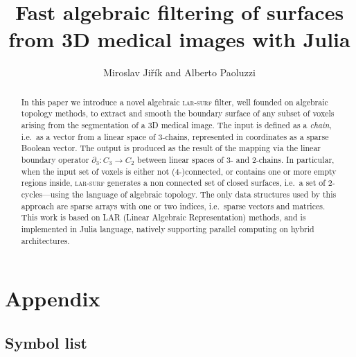 \documentclass[11pt, oneside]{article}   	%
\title{Fast algebraic filtering of surfaces from 3D medical images with Julia}
\author{Miroslav Ji\v{r}\'ik and Alberto Paoluzzi}
\date{}							%
\begin{document}
\maketitle

\begin{abstract}
In this paper we introduce a novel algebraic \textsc{lar-surf} filter, well founded on algebraic topology methods, to extract and smooth the boundary surface of any subset of voxels arising from the segmentation of a 3D medical image. The input is defined as a \emph{chain}, i.e.~as a vector from a linear space of 3-chains, represented in coordinates as a sparse Boolean vector. The output is produced as the result of the mapping via the linear boundary operator $\partial_3:C_3 \to C_2$ between linear spaces of 3- and 2-chains.  In particular, when the input set of voxels is either not (4-)connected, or contains one or more empty regions inside, \textsc{lar-surf} generates a non connected set of closed surfaces, i.e.~a set of 2-cycles---using the language of algebraic topology. The only data structures used by this approach are sparse arrays with one or two indices, i.e.~sparse vectors and matrices. This work is based on LAR (Linear Algebraic Representation) methods, and is implemented in Julia language, natively supporting parallel computing on hybrid architectures.
\end{abstract}

\tableofcontents









\appendix
\section{Appendix}
\subsection{Symbol list}
\end{document}
